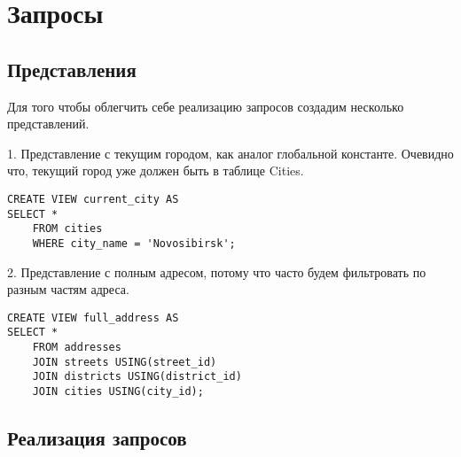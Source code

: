 \documentclass{report}
\begin{document}
\chapter{Запросы}

\section{Представления}

Для того чтобы облегчить себе реализацию запросов создадим несколько
представлений.

1. Представление с текущим городом, как аналог глобальной константе.
Очевидно что, текущий город уже должен быть в таблице Cities.

\begin{lstlisting}
CREATE VIEW current_city AS
SELECT *
    FROM cities 
    WHERE city_name = 'Novosibirsk'; 
\end{lstlisting}

2. Представление с полным адресом, потому что часто будем фильтровать
по разным частям адреса.

\begin{lstlisting}
CREATE VIEW full_address AS
SELECT *
    FROM addresses 
    JOIN streets USING(street_id)
    JOIN districts USING(district_id)
    JOIN cities USING(city_id);
\end{lstlisting}

\section{Реализация запросов}
\end{document}
